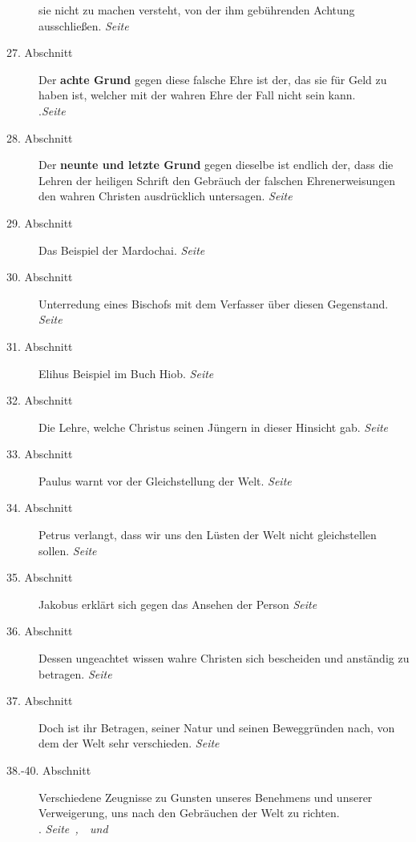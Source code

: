 \begin{description}
sie nicht zu machen versteht, von der ihm gebührenden Achtung ausschließen.
\dotfill \textit{Seite~\pageref{kap9_ab26}}\\
\item[27. Abschnitt] Der \textbf{achte Grund} gegen diese falsche Ehre ist der,
das sie
für Geld zu haben ist, welcher mit der wahren Ehre der Fall nicht sein kann.\\
.\dotfill \textit{Seite~\pageref{kap9_ab27}}\\
\item[28. Abschnitt] Der \textbf{neunte und letzte Grund} gegen dieselbe ist
endlich der,
dass die Lehren der heiligen Schrift den Gebräuch der falschen Ehrenerweisungen
den wahren Christen ausdrücklich untersagen.
\dotfill \textit{Seite~\pageref{kap9_ab28}}\\
\item[29. Abschnitt] Das Beispiel der Mardochai.
\dotfill \textit{Seite~\pageref{kap9_ab29}}\\
\item[30. Abschnitt] Unterredung eines Bischofs mit dem Verfasser über diesen
Gegenstand.
\dotfill \textit{Seite~\pageref{kap9_ab30}}\\
\item[31. Abschnitt] Elihus Beispiel im Buch Hiob.
\dotfill \textit{Seite~\pageref{kap9_ab31}}\\
\item[32. Abschnitt] Die Lehre, welche Christus seinen Jüngern in dieser
Hinsicht gab.
\dotfill \textit{Seite~\pageref{kap9_ab32}}\\
\item[33. Abschnitt] Paulus warnt vor der Gleichstellung der Welt.
\dotfill \textit{Seite~\pageref{kap9_ab33}}\\
\item[34. Abschnitt] Petrus verlangt, dass wir uns den Lüsten der Welt nicht
gleichstellen sollen.
\dotfill \textit{Seite~\pageref{kap9_ab34}}\\
\item[35. Abschnitt] Jakobus erklärt sich gegen das Ansehen der Person
\dotfill \textit{Seite~\pageref{kap9_ab35}}\\
\item[36. Abschnitt] Dessen ungeachtet wissen wahre Christen sich bescheiden und
anständig zu betragen.
\dotfill \textit{Seite~\pageref{kap9_ab36}}\\
\item[37. Abschnitt] Doch ist ihr Betragen, seiner Natur und seinen Beweggründen
nach, von dem der Welt sehr verschieden.
\dotfill \textit{Seite~\pageref{kap9_ab37}}\\
\item[38.-40. Abschnitt] Verschiedene Zeugnisse zu Gunsten unseres Benehmens und
unserer Verweigerung, uns nach den Gebräuchen der Welt zu richten.\\
.\dotfill
\textit{Seite~\pageref{kap9_ab38},~\pageref{kap9_ab39}~und~\pageref{kap9_ab40}}
\\

\end{description}

